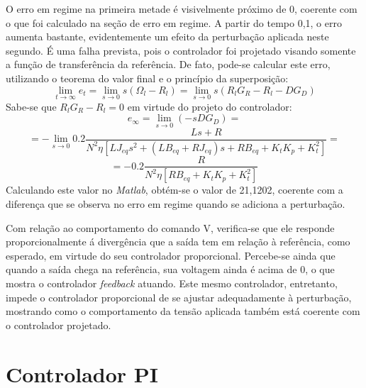 \documentclass{article}[twocolumn]
\begin{document}
	O erro em regime na primeira metade \'e visivelmente pr\'oximo de 0, coerente com o que
	foi calculado na se\c{c}\~ao de erro em regime. A partir do tempo
	0,1, o erro aumenta bastante, evidentemente um efeito da perturba\c{c}\~ao aplicada neste
	segundo. \'E uma falha prevista, pois o controlador foi projetado visando somente
	a fun\c{c}\~ao de transfer\^encia da refer\^encia. De fato, pode-se calcular este
	erro, utilizando o teorema do valor final e o princ\'ipio da superposi\c{c}\~ao:
	\begin{equation}
		\lim_{t \rightarrow \infty}e_t = \lim_{s \rightarrow 0}s(\Omega_l - R_l) =
		\lim_{s \rightarrow 0}s(R_lG_R - R_l - DG_D)
		\nonumber
	\end{equation}
	Sabe-se que $R_lG_R - R_l = 0$ em virtude do projeto do controlador:
	\begin{equation}
		e_\infty = \lim_{s \rightarrow 0}(-sDG_D) =
		\nonumber
	\end{equation}
	\begin{equation}
		= -\lim_{s \rightarrow 0}0.2\frac{Ls + R}
		{N^2\eta[LJ_{eq}s^2 + (LB_{eq} + RJ_{eq})s + RB_{eq} + K_tK_p + K_t^2]} =
		\nonumber
	\end{equation}
	\begin{equation}
		= -0.2\frac{R}
		{N^2\eta[RB_{eq} + K_tK_p + K_t^2]}
		\nonumber
	\end{equation}
	Calculando este valor no \textit{Matlab}, obt\'em-se o valor de 21,1202, coerente
	com a diferen\c{c}a que se observa no erro em regime quando se adiciona a perturba\c{c}\~ao.

	Com rela\c{c}\~ao ao comportamento do comando V, verifica-se que ele responde proporcionalmente
	\'a diverg\^encia que a sa\'ida tem em rela\c{c}\~ao \`a refer\^encia, como esperado, em
	virtude do seu controlador proporcional. Percebe-se ainda que quando a sa\'ida chega na
	refer\^encia, sua voltagem ainda \'e acima de 0, o que mostra o controlador
	\textit{feedback} atuando. Este mesmo controlador, entretanto, impede o controlador
	proporcional de se ajustar adequadamente \`a perturba\c{c}\~ao, mostrando como o
	comportamento da tens\~ao aplicada tamb\'em est\'a coerente com o controlador projetado.
	\section{Controlador PI}
\end{document}

